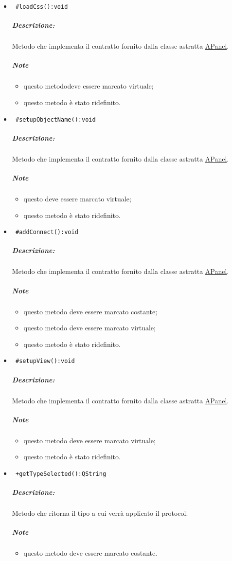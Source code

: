 \begin{itemize}
\item \color{blue}\verb! #loadCss():void!
\color{black} 
\subparagraph{Descrizione:}Metodo che implementa il contratto fornito dalla classe astratta \hyperref[speAPanel]{APanel}.
 \subparagraph{Note}
 \begin{itemize}
  \item questo metododeve essere marcato virtuale;
 \item questo metodo è stato ridefinito.
 \end{itemize}

\item\color{blue}\verb! #setupObjectName():void!
\color{black}
\subparagraph{Descrizione:}Metodo che implementa il contratto fornito dalla classe astratta \hyperref[speAPanel]{APanel}.
 \subparagraph{Note}
 \begin{itemize}
  \item questo deve essere marcato virtuale;
 \item questo metodo è stato ridefinito.
 \end{itemize}

\item \color{blue}\verb! #addConnect():void!
\color{black}
\subparagraph{Descrizione:} Metodo che implementa il contratto fornito dalla classe astratta \hyperref[speAPanel]{APanel}.
 \subparagraph{Note}
 \begin{itemize}
 \item questo metodo deve essere marcato costante;
 \item questo metodo deve essere marcato virtuale;
 \item questo metodo è stato ridefinito.
 \end{itemize}

\item \color{blue}\verb! #setupView():void!
\color{black}
\subparagraph{Descrizione:} Metodo che implementa il contratto fornito dalla classe astratta \hyperref[speAPanel]{APanel}.
 \subparagraph{Note}
 \begin{itemize}
 \item questo metodo deve essere marcato virtuale;
 \item questo metodo è stato ridefinito.
 \end{itemize}
\item \color{blue}\verb! +getTypeSelected():QString!
\color{black} 
\subparagraph{Descrizione: }Metodo che ritorna il tipo a cui verrà applicato il protocol\g{}.
 \subparagraph{Note}
 \begin{itemize}
 \item questo metodo deve essere marcato costante.
 \end{itemize}
 

\end{itemize}
